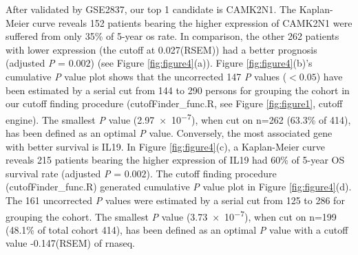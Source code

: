 \documentclass[12pt, a4paper]{article}
\begin{document}
After validated by GSE2837, our top 1 candidate is \acrfull{CAMK2N1}. The Kaplan-Meier curve reveals 152 patients bearing the higher expression of \acrshort{CAMK2N1} were suffered from only 35\% of 5-year \acrshort{os} rate. In comparison, the other 262 patients with lower expression (the cutoff at 0.027(RSEM)) had a better prognosis (adjusted \textit{P} = $0.002$) (see Figure \ref{fig:figure4}(a)).
Figure \ref{fig:figure4}(b)'s cumulative \textit{P} value plot shows that the uncorrected 147 \textit{P} values ($< 0.05$) have been estimated by a serial cut from 144 to 290 persons for grouping the cohort in our cutoff finding procedure (cutofFinder\_func.R, see Figure \ref{fig:figure1}, cutoff engine). The smallest \textit{P} value (\num{2.97e-7}), when cut on n=262 (63.3\% of 414), has been defined as an optimal \textit{P} value.
Conversely, the most associated gene with better survival is \acrfull{IL19}. In Figure \ref{fig:figure4}(c), a Kaplan-Meier curve reveals 215 patients bearing the higher expression of \acrshort{IL19} had 60\% of 5-year OS survival rate (adjusted \textit{P} = $0.002$). The cutoff finding procedure (cutofFinder\_func.R) generated cumulative \textit{P} value plot in Figure \ref{fig:figure4}(d). The 161 uncorrected \textit{P} values were estimated by a serial cut from 125 to 286 for grouping the cohort. The smallest \textit{P} value (\num{3.73e-7}), when cut on n=199 (48.1\% of total cohort 414), has been defined as an optimal \textit{P} value with a cutoff value -0.147(RSEM) of \acrshort{rnaseq}.
\end{document}
